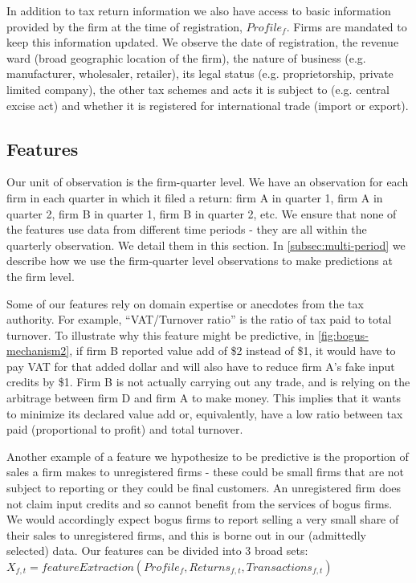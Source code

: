 In addition to tax return information we also have access to basic information provided by the firm at the time of registration, $Profile_f$. Firms are mandated to keep this information updated. We observe the date of registration, the revenue ward (broad geographic location of the firm), the nature of business (e.g. manufacturer, wholesaler, retailer), its legal status (e.g. proprietorship, private limited company), the other tax schemes and acts it is subject to (e.g. central excise act) and whether it is registered for international trade (import or export).

\subsection{Features}
\label{subsec:features}
Our unit of observation is the firm-quarter level. We have an observation for each firm in each quarter in which it filed a return: firm A in quarter 1, firm A in quarter 2, firm B in quarter 1, firm B in quarter 2, etc. We ensure that none of the features use data from different time periods - they are all within the quarterly observation. We detail them in this section. In \cref{subsec:multi-period} we describe how we use the firm-quarter level observations to make predictions at the firm level.

Some of our features rely on domain expertise or anecdotes from the tax authority. For example, ``VAT/Turnover ratio'' is the ratio of tax paid to total turnover. To illustrate why this feature might be predictive, in \cref{fig:bogus-mechanism2}, if firm B reported value add of \$2 instead of \$1, it would have to pay VAT for that added dollar and will also have to reduce firm A's fake input credits by \$1. Firm B is not actually carrying out any trade, and is relying on the arbitrage between firm D and firm A to make money. This implies that it wants to minimize its declared value add or, equivalently, have a low ratio between tax paid (proportional to profit) and total turnover. 

Another example of a feature we hypothesize to be predictive is the proportion of sales a firm makes to unregistered firms - these could be small firms that are not subject to reporting or they could be final customers. An unregistered firm does not claim input credits and so cannot benefit from the services of bogus firms. We would accordingly expect bogus firms to report selling a very small share of their sales to unregistered firms, and this is borne out in our (admittedly selected) data. Our features can be divided into 3 broad sets: \\
$X_{f,t}=featureExtraction(Profile_f, Returns_{f,t},Transactions_{f,t})$ 

